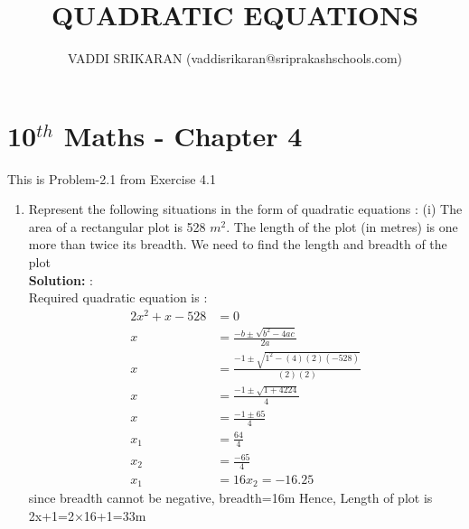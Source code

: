 \documentclass[12pt]{article}
\title{QUADRATIC EQUATIONS}
\author{VADDI SRIKARAN (vaddisrikaran@sriprakashschools.com)}
\newcommand{\solution}{\noindent \textbf{Solution: }}
\begin{document}
    \maketitle
    \section*{10$^{th}$ Maths - Chapter 4}
    This is Problem-2.1 from Exercise 4.1
    \begin{enumerate}
    \item Represent the following situations in the form of quadratic equations :
(i) The area of a rectangular plot is 528 $m^2$. The length of the plot (in metres) is one more than twice its breadth. We need to find the length and breadth of the plot\\
\solution:\\Required quadratic equation is :
\begin{align}
2x^2+x-528 &= 0\\
x&=\frac{-b\pm\sqrt{b^2-4ac}}{2a}\\
x&=\frac{-1\pm\sqrt{1^2-(4)(2)(-528)}}{(2)(2)}\\
x&=\frac{-1\pm\sqrt{1+4224}}{4}\\
x&=\frac{-1\pm 65}{4}\\
x_1&=\frac{64}{4}\\
x_2&=\frac{-65}{4}\\
x_1&=16
x_2=-16.25
\end{align}
since breadth cannot be negative, breadth=16m
Hence, Length of plot is {2x+1=2×16+1=33m}\\
\end{enumerate}
\end{document}
